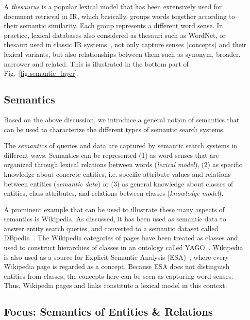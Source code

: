 A \emph{thesaurus} 
is a popular lexical model that has been extensively used for document retrieval in IR, which basically, groups words together according to their semantic similarity. Each group represents a different word sense. In practice, lexical databases also considered as thesauri such as WordNet, or thesauri used in classic IR systems~\cite{DBLP:conf/sigir/Giger88}, not only capture senses (concepts) and their lexical variants, but also relationships between them such as synonym, broader, narrower and related. This is illustrated in the bottom part of Fig.~\ref{fig:semantic_layer}. 


\subsection{Semantics} 
Based on the above discussion, we introduce a general notion of semantics that can be used to characterize the different types of semantic search systems.

\begin{definition} The \emph{semantics} of queries and data are captured by semantic search systems in different ways. Semantics can be represented (1) as word senses that are organized through lexical relations between words (\emph{lexical model}), (2) as specific knowledge about concrete entities, i.e. specific attribute values and relations between entities (\emph{semantic data}) or (3) as general knowledge about classes of entities, class attributes, and relations between classes (\emph{knowledge model}). 
\end{definition}

A prominent example that can be used to illustrate these many aspects of semantics is Wikipedia. As discussed, it has been used as semantic data to answer entity search queries, and converted to a semantic dataset called DBpedia~\cite{DBLP:journals/ws/BizerLKABCH09}. The Wikipedia categories of pages have been treated as classes and used to construct hierarchies of classes in an ontology called YAGO~\cite{DBLP:conf/www/SuchanekKW07}. Wikipedia is also used as a source for Explicit Semantic Analysis (ESA)~\cite{DBLP:journals/tois/EgoziMG11}, where every Wikipedia page is regarded as a concept. Because ESA does not distinguish entities from classes, the concepts here can be seen as capturing word senses. Thus, Wikipedia pages and links constitute a lexical model in this context. 

\subsection{Focus: Semantics of Entities \& Relations} 


